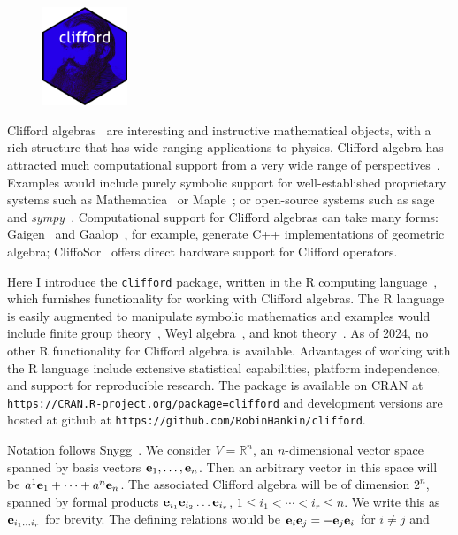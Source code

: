 \documentclass{birkjour}
\theoremstyle{definition}
\theoremstyle{remark}
\numberwithin{equation}{section}
\begin{document}
\setlength{\intextsep}{0pt}
\begin{figure}
  \begin{center}
\includegraphics[width=1in]{clifford.png}
  \end{center}
\end{figure}
Clifford algebras~\cite{hestenes1987} are interesting and instructive
mathematical objects, with a rich structure that has wide-ranging
applications to physics.  {Clifford algebra has
  attracted much computational support from a very wide range of
  perspectives~\cite{burns2020}.  Examples would include purely
  symbolic support for well-established proprietary systems such as
  Mathematica~\cite{aragon2018} or Maple~\cite{ablamowicz2005}; or
  open-source systems such as sage~\cite{sagemath2019,scrimshaw2022}
  and \textit{sympy}~\cite{sympy2017}.  Computational support for
  Clifford algebras can take many forms: Gaigen~\cite{fontijne2006}
  and Gaalop~\cite{hildenbrand2010}, for example, generate C++
  implementations of geometric algebra; CliffoSor~\cite{franchini2008}
  offers direct hardware support for Clifford operators.  }

Here I introduce the {\tt clifford} package, written in the R
computing language~\cite{rcore2022}, which furnishes functionality for
working with Clifford algebras.  The R language is easily augmented to
manipulate symbolic mathematics and examples would include finite
group theory~\cite{hankin2020_permutations}, Weyl
algebra~\cite{hankin2022_weyl_arxiv}, and knot
theory~\cite{hankin2023}.  As of 2024, no other R functionality for
Clifford algebra is available.  Advantages of working with the R
language include extensive statistical capabilities, platform
independence, and support for reproducible research.  The package is
available on CRAN at
\verb+https://CRAN.R-project.org/package=clifford+ and development
versions are hosted at github at
\verb+https://github.com/RobinHankin/clifford+.

\newcommand{\ei}[1]{\ensuremath{{\bf e}_{#1}}}

Notation follows Snygg~\cite{snygg2010}.  We consider
$V=\mathbb{R}^n$, an $n$-dimensional vector space spanned by basis
vectors $\ei{1},\ldots,\ei{n}$.  Then an arbitrary vector in this
space will be $a^1\ei{1}+\cdots+a^n\ei{n}$.  The associated Clifford
algebra will be of dimension $2^n$, spanned by formal products
$\ei{i_1}\ei{i_2}\ldots\ei{i_r}$, $1\leqslant i_1<\cdots<i_r\leqslant
n$.  We write this as $\ei{i_1\ldots i_r}$ for brevity.  The defining
relations would be $\ei{i}\ei{j}=-\ei{j}\ei{i}$ for $i\neq j$ and
\end{document}
